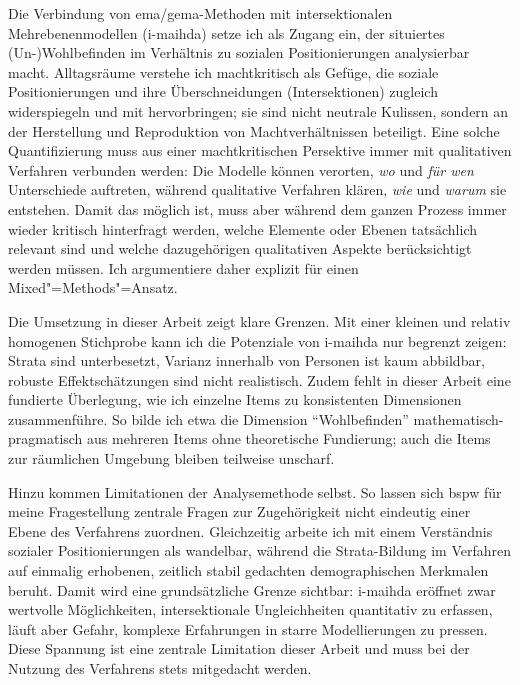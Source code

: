 Die Verbindung von \gls{ema}/\gls{gema}-Methoden mit intersektionalen Mehrebenenmodellen (\gls{i-maihda}) setze ich als Zugang ein, der situiertes (Un\nobreakdash-)Wohl\-be\-find\-en im Verhältnis zu sozialen Positionierungen analysierbar macht. Alltagsräume verstehe ich machtkritisch als Gefüge, die soziale Positionierungen und ihre Überschneidungen (Intersektionen) zugleich widerspiegeln und mit hervorbringen; sie sind nicht neutrale Kulissen, sondern an der Herstellung und Reproduktion von Machtverhältnissen beteiligt. 
Eine solche Quantifizierung muss aus einer machtkritischen Persektive immer mit qualitativen Verfahren verbunden werden: Die Modelle können verorten, \emph{wo} und \emph{für wen} Unterschiede auftreten, während qualitative Verfahren klären, \emph{wie} und \emph{warum} sie entstehen. Damit das möglich ist, muss aber während dem ganzen Prozess immer wieder kritisch hinterfragt werden, welche Elemente oder Ebenen tatsächlich relevant sind und welche dazugehörigen qualitativen Aspekte berücksichtigt werden müssen. Ich argumentiere daher explizit für einen Mixed"=Methods"=Ansatz.

Die Umsetzung in dieser Arbeit zeigt klare Grenzen. Mit einer kleinen und relativ homogenen Stichprobe kann ich die Potenziale von \gls{i-maihda} nur begrenzt zeigen: Strata sind unterbesetzt, Varianz innerhalb von Personen ist kaum abbildbar, robuste Effektschätzungen sind nicht realistisch. Zudem fehlt in dieser Arbeit eine fundierte Überlegung, wie ich einzelne Items zu konsistenten Dimensionen zusammenführe. So bilde ich etwa die Dimension \enquote{Wohlbefinden} mathematisch-pragmatisch aus mehreren Items ohne theoretische Fundierung; auch die Items zur räumlichen Umgebung bleiben teilweise unscharf.

Hinzu kommen Limitationen der Analysemethode selbst. So lassen sich \gls{bspw} für meine Fragestellung zentrale Fragen zur Zugehörigkeit nicht eindeutig einer Ebene des Verfahrens zuordnen. Gleichzeitig arbeite ich mit einem Verständnis sozialer Positionierungen als wandelbar, während die Strata-Bildung im Verfahren auf einmalig erhobenen, zeitlich stabil gedachten demographischen Merkmalen beruht. Damit wird eine grundsätzliche Grenze sichtbar: \gls{i-maihda} eröffnet zwar wertvolle Möglichkeiten, intersektionale Ungleichheiten quantitativ zu erfassen, läuft aber Gefahr, komplexe Erfahrungen in starre Modellierungen zu pressen. Diese Spannung ist eine zentrale Limitation dieser Arbeit und muss bei der Nutzung des Verfahrens stets mitgedacht werden.

